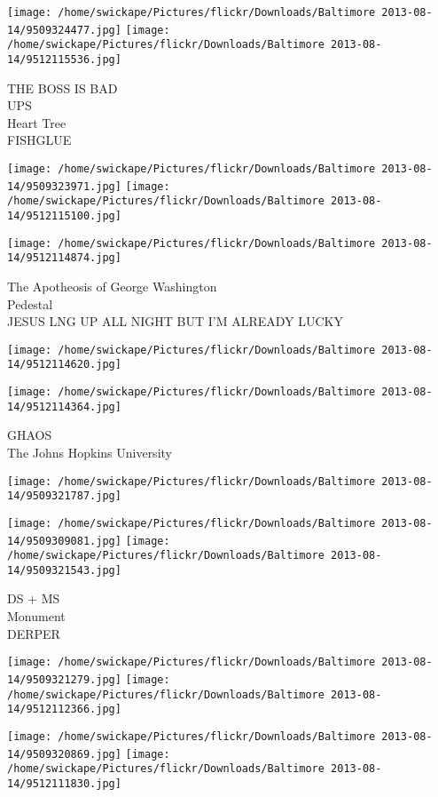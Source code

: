 \documentclass[10pt,letterpaper]{article}
\begin{document}
\texttt{[image: /home/swickape/Pictures/flickr/Downloads/Baltimore 2013-08-14/9509324477.jpg]}
\texttt{[image: /home/swickape/Pictures/flickr/Downloads/Baltimore 2013-08-14/9512115536.jpg]}

THE BOSS IS BAD\\
UPS\\
Heart Tree\\
FISHGLUE
\pagebreak

\texttt{[image: /home/swickape/Pictures/flickr/Downloads/Baltimore 2013-08-14/9509323971.jpg]}
\texttt{[image: /home/swickape/Pictures/flickr/Downloads/Baltimore 2013-08-14/9512115100.jpg]}

\texttt{[image: /home/swickape/Pictures/flickr/Downloads/Baltimore 2013-08-14/9512114874.jpg]}

The Apotheosis of George Washington\\
Pedestal\\
JESUS LNG UP ALL NIGHT BUT I'M ALREADY LUCKY
\pagebreak

\texttt{[image: /home/swickape/Pictures/flickr/Downloads/Baltimore 2013-08-14/9512114620.jpg]}

\vspace{0.25in}
\texttt{[image: /home/swickape/Pictures/flickr/Downloads/Baltimore 2013-08-14/9512114364.jpg]}

GHAOS\\
The Johns Hopkins University
\pagebreak

\texttt{[image: /home/swickape/Pictures/flickr/Downloads/Baltimore 2013-08-14/9509321787.jpg]}

\vspace{0.25in}
\texttt{[image: /home/swickape/Pictures/flickr/Downloads/Baltimore 2013-08-14/9509309081.jpg]}
\texttt{[image: /home/swickape/Pictures/flickr/Downloads/Baltimore 2013-08-14/9509321543.jpg]}

DS + MS\\
Monument\\
DERPER
\pagebreak

\texttt{[image: /home/swickape/Pictures/flickr/Downloads/Baltimore 2013-08-14/9509321279.jpg]}
\texttt{[image: /home/swickape/Pictures/flickr/Downloads/Baltimore 2013-08-14/9512112366.jpg]}

\texttt{[image: /home/swickape/Pictures/flickr/Downloads/Baltimore 2013-08-14/9509320869.jpg]}
\texttt{[image: /home/swickape/Pictures/flickr/Downloads/Baltimore 2013-08-14/9512111830.jpg]}
\end{document}
